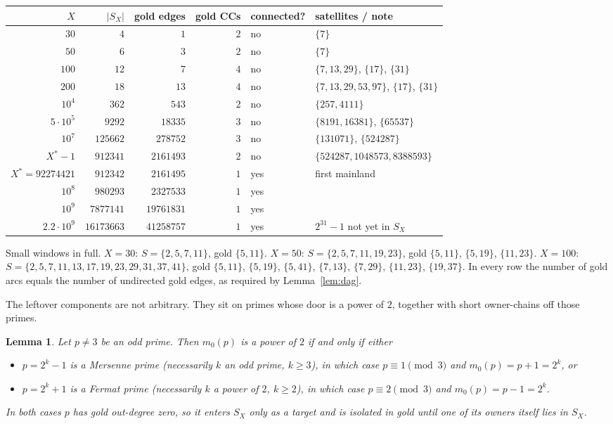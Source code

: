 \documentclass[11pt,a4paper]{article}
\newtheorem{lemma}{Lemma}
\begin{document}
\begin{center}
\small
\begin{tabular}{@{}rrrrll@{}}
\toprule
\(X\) & \(|S_X|\) & gold edges & gold CCs & connected? & satellites / note \\
\midrule
\(30\)    & \(4\)   & \(1\)   & \(2\) & no & \(\{7\}\) \\
\(50\)    & \(6\)   & \(3\)   & \(2\) & no & \(\{7\}\) \\
\(100\)   & \(12\)  & \(7\)   & \(4\) & no & \(\{7,13,29\}\), \(\{17\}\), \(\{31\}\) \\
\(200\)   & \(18\)  & \(13\)  & \(4\) & no & \(\{7,13,29,53,97\}\), \(\{17\}\), \(\{31\}\) \\
\(10^4\)  & \(362\) & \(543\) & \(2\) & no & \(\{257,4111\}\) \\
\(5\cdot 10^5\) & \(9292\) & \(18335\) & \(3\) & no & \(\{8191,16381\}\), \(\{65537\}\) \\
\(10^7\)  & \(125662\) & \(278752\) & \(3\) & no & \(\{131071\}\), \(\{524287\}\) \\
\(X^*-1\) & \(912341\) & \(2161493\) & \(2\) & no & \(\{524287,1048573,8388593\}\) \\
\(X^*=92274421\) & \(912342\) & \(2161495\) & \(1\) & yes & first mainland \\
\(10^8\)  & \(980293\) & \(2327533\) & \(1\) & yes & \\
\(10^9\)  & \(7877141\) & \(19761831\) & \(1\) & yes & \\
\(2.2\cdot 10^9\) & \(16173663\) & \(41258757\) & \(1\) & yes & \(2^{31}-1\) not yet in \(S_X\) \\
\bottomrule
\end{tabular}
\end{center}

\noindent
Small windows in full.
\(X=30\): \(S=\{2,5,7,11\}\), gold \(\{5,11\}\).
\(X=50\): \(S=\{2,5,7,11,19,23\}\), gold \(\{5,11\}\), \(\{5,19\}\), \(\{11,23\}\).
\(X=100\): \(S=\{2,5,7,11,13,17,19,23,29,31,37,41\}\), gold \(\{5,11\}\), \(\{5,19\}\), \(\{5,41\}\), \(\{7,13\}\), \(\{7,29\}\), \(\{11,23\}\), \(\{19,37\}\).
In every row the number of gold arcs equals the number of undirected gold edges, as required by Lemma~\ref{lem:dag}.

The leftover components are not arbitrary.
They sit on primes whose door is a power of \(2\), together with short owner-chains off those primes.

\begin{lemma}
\label{lem:twopow}
Let \(p\neq 3\) be an odd prime.
Then \(m_0(p)\) is a power of \(2\) if and only if either
\begin{itemize}
\item \(p=2^k-1\) is a Mersenne prime (necessarily \(k\) an odd prime, \(k\ge 3\)), in which case \(p\equiv 1\pmod{3}\) and \(m_0(p)=p+1=2^k\), or
\item \(p=2^k+1\) is a Fermat prime (necessarily \(k\) a power of \(2\), \(k\ge 2\)), in which case \(p\equiv 2\pmod{3}\) and \(m_0(p)=p-1=2^k\).
\end{itemize}
In both cases \(p\) has gold out-degree zero, so it enters \(S_X\) only as a target and is isolated in gold until one of its owners itself lies in \(S_X\).
\end{lemma}
\end{document}

